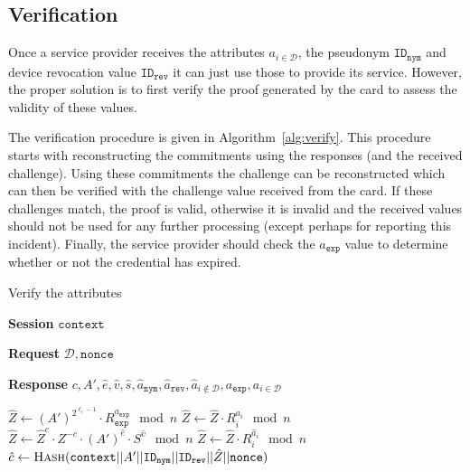\subsection{Verification}

Once a service provider receives the attributes $a_{i \in \mathcal{D}}$, the pseudonym $\mathtt{ID_{nym}}$ and device revocation value $\mathtt{ID_{rev}}$ it can just use those to provide its service. However, the proper solution is to first verify the proof generated by the card to assess the validity of these values.

The verification procedure is given in Algorithm~\ref{alg:verify}. This procedure starts with reconstructing the commitments using the responses (and the received challenge). Using these commitments the challenge can be reconstructed which can then be verified with the challenge value received from the card. If these challenges match, the proof is valid, otherwise it is invalid and the received values should not be used for any further processing (except perhaps for reporting this incident). Finally, the service provider should check the $a_{\mathtt{exp}}$ value to determine whether or not the credential has expired.

\begin{algorithm}
  \caption{Verify the attributes}
  \label{alg:verify}
  \addtolength{\baselineskip}{1.5mm}

  \begin{algorithmic}[1]
    \item[\textbf{Session}] $\mathtt{context}$
    \item[\textbf{Request}] $\mathcal{D}, \mathtt{nonce}$
    \item[\textbf{Response}] $c, A', \hat{e}, \hat{v}, \hat{s}, \hat{a}_\mathtt{nym}, \hat{a}_\mathtt{rev}, \hat{a}_{i \notin \mathcal{D}}, a_\mathtt{exp}, a_{i \in \mathcal{D}}$

    \Statex
      \Statex {}
      \State $\hat{Z} \gets (A')^{2^{\ell_e - 1}} \cdot R_\mathtt{exp}^{a_\mathtt{exp}} \mod n$
       
        \State $\hat{Z} \gets \hat{Z} \cdot R_i^{a_i} \mod n$
      \EndFor
      \State $\hat{Z} \gets \hat{Z}^c \cdot Z^{-c} \cdot (A')^{\hat{e}} \cdot S^{\hat{v}} \mod n$
       
        \State $\hat{Z} \gets \hat{Z} \cdot R_i^{\hat{a}_i} \mod n$
      \EndFor
      \Statex {}
      \State $\hat{c} \gets \Call{Hash}{\mathtt{context} || A' || \mathtt{ID_{nym}} || \mathtt{ID_{rev}} ||
        \hat{Z} || \mathtt{nonce}}$
      \Statex {}
        \Return {}
      \Else
        \Return {}
      \EndIf
    \EndFunction
  \end{algorithmic}
\end{algorithm}




